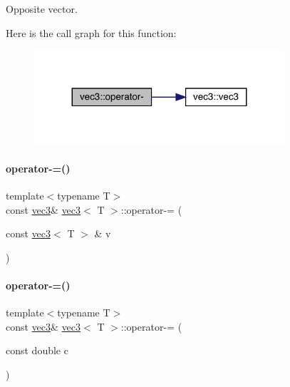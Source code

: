 Opposite vector. 

Here is the call graph for this function\+:\nopagebreak
\begin{figure}[H]
\begin{center}
\leavevmode
\includegraphics[width=263pt]{structvec3_a9ee0d5d83bd70141b9424928d0ea9c98_cgraph}
\end{center}
\end{figure}
\mbox{\label{structvec3_a6302bef90ffb5d572b9d452d902266c5}} 
\paragraph{\texorpdfstring{operator-\/=()}{operator-=()}\hspace{0.1cm}{\footnotesize\ttfamily [1/2]}}
{\footnotesize\ttfamily template$<$typename T$>$ \\
const \mbox{\hyperlink{structvec3}{vec3}}\& \mbox{\hyperlink{structvec3}{vec3}}$<$ T $>$\+::operator-\/= (\begin{DoxyParamCaption}\item[{const \mbox{\hyperlink{structvec3}{vec3}}$<$ T $>$ \&}]{v }\end{DoxyParamCaption})\hspace{0.3cm}{\ttfamily [inline]}}

\mbox{\label{structvec3_aef8422b6e70a53e4c10df464bb24507c}} 
\paragraph{\texorpdfstring{operator-\/=()}{operator-=()}\hspace{0.1cm}{\footnotesize\ttfamily [2/2]}}
{\footnotesize\ttfamily template$<$typename T$>$ \\
const \mbox{\hyperlink{structvec3}{vec3}}\& \mbox{\hyperlink{structvec3}{vec3}}$<$ T $>$\+::operator-\/= (\begin{DoxyParamCaption}\item[{const double}]{c }\end{DoxyParamCaption})\hspace{0.3cm}{\ttfamily [inline]}}

